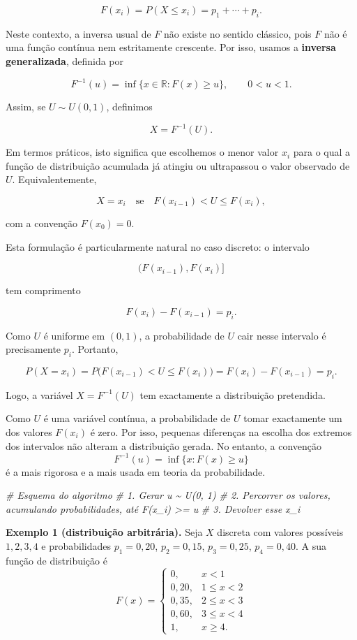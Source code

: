 \documentclass[
  portuguese,
  11pt,
  openany]{book}
\newenvironment{Shaded}{\begin{snugshade}}{\end{snugshade}}
\newcommand{\CommentTok}[1]{\textcolor[rgb]{0.56,0.35,0.01}{\textit{#1}}}
\begin{document}
\[
F(x_i)=P(X\leq x_i)=p_1+\cdots+p_i.
\]

Neste contexto, a inversa usual de \(F\) não existe no sentido clássico, pois \(F\) não é uma
função contínua nem estritamente crescente. Por isso, usamos a \textbf{inversa generalizada},
definida por

\[
F^{-1}(u)=\inf\{x\in\mathbb{R}: F(x)\geq u\}, \qquad 0<u<1.
\]

Assim, se \(U\sim U(0,1)\), definimos

\[
X=F^{-1}(U).
\]

Em termos práticos, isto significa que escolhemos o menor valor \(x_i\) para o qual a
função de distribuição acumulada já atingiu ou ultrapassou o valor observado de \(U\).
Equivalentemente,

\[
X=x_i
\quad \text{se} \quad
F(x_{i-1}) < U \leq F(x_i),
\]

com a convenção \(F(x_0)=0\).

Esta formulação é particularmente natural no caso discreto: o intervalo

\[
\bigl(F(x_{i-1}),F(x_i)\bigr]
\]

tem comprimento

\[
F(x_i)-F(x_{i-1})=p_i.
\]

Como \(U\) é uniforme em \((0,1)\), a probabilidade de \(U\) cair nesse intervalo é
precisamente \(p_i\). Portanto,

\[
P(X=x_i)
=
P\bigl(F(x_{i-1})<U\leq F(x_i)\bigr)
=
F(x_i)-F(x_{i-1})
=
p_i.
\]

Logo, a variável \(X=F^{-1}(U)\) tem exactamente a distribuição pretendida.

Como \(U\) é uma variável contínua, a probabilidade de \(U\) tomar exactamente um dos valores
\(F(x_i)\) é zero. Por isso, pequenas diferenças na escolha dos extremos dos intervalos não
alteram a distribuição gerada. No entanto, a convenção
\[
F^{-1}(u)=\inf\{x:F(x)\geq u\}
\]
é a mais rigorosa e a mais usada em teoria da probabilidade.

\begin{Shaded}
\begin{Highlighting}[]
\CommentTok{\# Esquema do algoritmo}
\CommentTok{\# 1. Gerar u \textasciitilde{} U(0, 1)}
\CommentTok{\# 2. Percorrer os valores, acumulando probabilidades, até F(x\_i) \textgreater{}= u}
\CommentTok{\# 3. Devolver esse x\_i}
\end{Highlighting}
\end{Shaded}

\textbf{Exemplo 1 (distribuição arbitrária).} Seja \(X\) discreta com valores possíveis
\(1,2,3,4\) e probabilidades \(p_1 = 0{,}20\), \(p_2 = 0{,}15\), \(p_3 = 0{,}25\),
\(p_4 = 0{,}40\). A sua função de distribuição é
\[F(x) = \begin{cases} 0, & x < 1 \\ 0{,}20, & 1 \leq x < 2 \\ 0{,}35, & 2 \leq x < 3 \\ 0{,}60, & 3 \leq x < 4 \\ 1, & x \geq 4. \end{cases}\]
\end{document}
